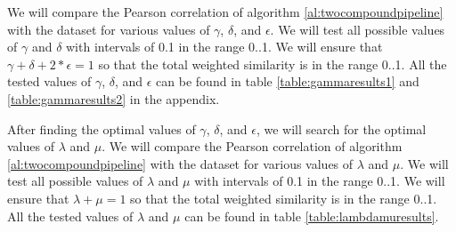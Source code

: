 \documentclass{article}
\begin{document}
We will compare the Pearson correlation of algorithm \ref{al:twocompoundpipeline} with the dataset for various values of $\gamma$, $\delta$, and $\epsilon$. We will test all possible values of $\gamma$ and $\delta$ with intervals of 0.1 in the range 0..1. We will ensure that $\gamma + \delta + 2 * \epsilon = 1$ so that the total weighted similarity is in the range 0..1. All the tested values of $\gamma$, $\delta$, and $\epsilon$ can be found in table \ref{table:gammaresults1} and \ref{table:gammaresults2} in the appendix. 

After finding the optimal values of $\gamma$, $\delta$, and $\epsilon$, we will search for the optimal values of $\lambda$ and $\mu$. We will compare the Pearson correlation of algorithm \ref{al:twocompoundpipeline} with the dataset for various values of $\lambda$ and $\mu$. We will test all possible values of $\lambda$ and $\mu$ with intervals of 0.1 in the range 0..1. We will ensure that $\lambda + \mu = 1$ so that the total weighted similarity is in the range 0..1. All the tested values of $\lambda$ and $\mu$ can be found in table \ref{table:lambdamuresults}.






\end{document}
